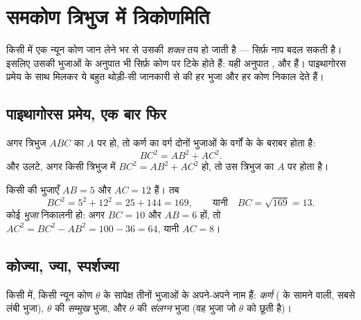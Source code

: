 \chapter{समकोण त्रिभुज में त्रिकोणमिति}\label{ch:g9:trig}

किसी  में एक न्यून कोण जान लेने भर से उसकी \emph{शक्ल}
तय हो जाती है --- सिर्फ़ नाप बदल सकती है। इसलिए उसकी भुजाओं के अनुपात
भी सिर्फ़ कोण पर टिके होते हैं: यही अनुपात ,  और 
हैं। पाइथागोरस प्रमेय के साथ मिलकर ये बहुत थोड़ी-सी जानकारी से  की हर भुजा और हर कोण निकाल देते हैं।

\section{पाइथागोरस प्रमेय, एक बार फिर}

\begin{theorem}[पाइथागोरस]\label{thm:g9:trig:pythagoras}
अगर त्रिभुज $ABC$ का $A$ पर  हो, तो कर्ण का वर्ग दोनों 
भुजाओं के वर्गों के  के बराबर होता है:
\[
BC^2 = AB^2 + AC^2 .
\]
और उलटे, अगर किसी त्रिभुज में $BC^2 = AB^2 + AC^2$ हो, तो उस त्रिभुज
का $A$ पर  होता है।
\end{theorem}
\admitted

\begin{example}\label{ex:g9:trig:pythagoras}
किसी  की  भुजाएँ $AB = 5$ और $AC = 12$ हैं। तब
\[
BC^2 = 5^2 + 12^2 = 25 + 144 = 169,
\qquad\text{यानी}\quad BC = \sqrt{169} = 13 .
\]
कोई \emph{ भुजा} निकालनी हो: अगर $BC = 10$ और $AB = 6$ हों, तो
$AC^2 = BC^2 - AB^2 = 100 - 36 = 64$, यानी $AC = 8$।
\end{example}

\section{कोज्या, ज्या, स्पर्शज्या}

किसी  में, किसी न्यून कोण $\theta$ के सापेक्ष तीनों
भुजाओं के अपने-अपने नाम हैं: \emph{कर्ण} ( के सामने वाली, सबसे
लंबी भुजा), $\theta$ की \emph{सम्मुख} भुजा, और $\theta$ की
\emph{संलग्न} भुजा (वह  भुजा जो $\theta$ को छूती है)।


